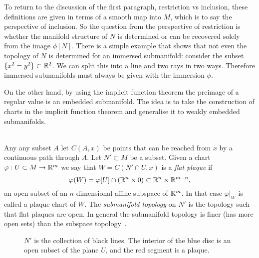 To return to the discussion of the first paragraph, restriction vs inclusion, these definitions are given in terms of a smooth map into $M$, which is to say the perspective of inclusion.
So the question from the perspective of restriction is whether the manifold structure of $N$ is determined or can be recovered solely from the image $\phi[N]$.
There is a simple example that shows that not even the topology of $N$ is determined for an immersed submanifold: consider the subset $\{x^2 = y^2\} \subset \mathbb{R}^2$.
We can split this into a line and two rays in two ways.
Therefore immersed submanifolds must always be given with the immersion $\phi$.

On the other hand, by using the implicit function theorem the preimage of a regular value is an embedded submanifold.
The idea is to take the construction of charts in the implicit function theorem and generalise it to weakly embedded submanifolds.

\begin{definition}
\label{def:plaques}
\textup{\cite[Def~1.2.1,1.2.2,Thm~1.2.7]{Sharpe1997}} \\
Any any subset $A$ let $C(A,x)$ be points that can be reached from $x$ by a continuous path through $A$.
Let $N' \subset M$ be a subset.
Given a chart $\varphi: U \subset M \to \mathbb{R}^m$ we say that $W = C(N'\cap U,x)$ is a \emph{flat plaque} if 
\[
\varphi(W) = \varphi[U] \cap (\mathbb{R}^n \times 0) \subset \mathbb{R}^n \times \mathbb{R}^{m-n},
\]
an open subset of an $n$-dimensional affine subspace of $\mathbb{R}^m$.
In that case $\varphi|_W$ is called a plaque chart of $W$.
The \emph{submanifold topology} on $N'$ is the topology such that flat plaques are open.
In general the submanifold topology is finer (has more open sets) than the subspace topology~\cite[Def~1.2.4]{Sharpe1997}.
\end{definition}

\begin{figure}[h]
\begin{center}
\caption{$N'$ is the collection of black lines. The interior of the blue disc is an open subset of the plane $U$, and the red segment is a plaque.}
\end{center}
\end{figure}

